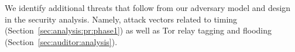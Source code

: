 %
%
We identify additional threats that follow from our adversary model and design
in the security analysis.  Namely, attack vectors related to
	timing (Section~\ref{sec:analysis:pr:phase1}) as well as
	Tor relay tagging and flooding (Section~\ref{sec:auditor:analysis}).

